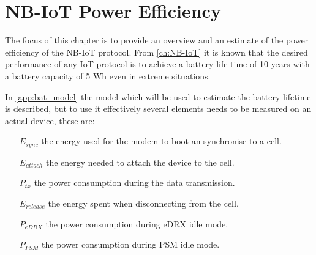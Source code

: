 \chapter{NB-IoT Power Efficiency}

The focus of this chapter is to provide an overview and an estimate of the power efficiency of the NB-IoT protocol. From \autoref{ch:NB-IoT} it is known that the desired performance of any IoT protocol is to achieve a battery life time of 10 years with a battery capacity of 5 Wh even in extreme situations. 

In \autoref{app:bat_model} the model which will be used to estimate the battery lifetime is described, but to use it effectively several elements needs to be measured on an actual device, these are:
\begin{itemize}
\item [$E_{sync}$] the energy used for the modem to boot an synchronise to a cell.
\item [$E_{attach}$] the energy needed to attach the device to the cell.
\item [$P_{tx}$] the power consumption during the data transmission.
\item [$E_{release}$] the energy spent when disconnecting from the cell.
\item [$P_{eDRX}$] the power consumption during \gls{eDRX} idle mode.
\item [$P_{PSM}$] the power consumption during \gls{PSM} idle mode.
\end{itemize}

